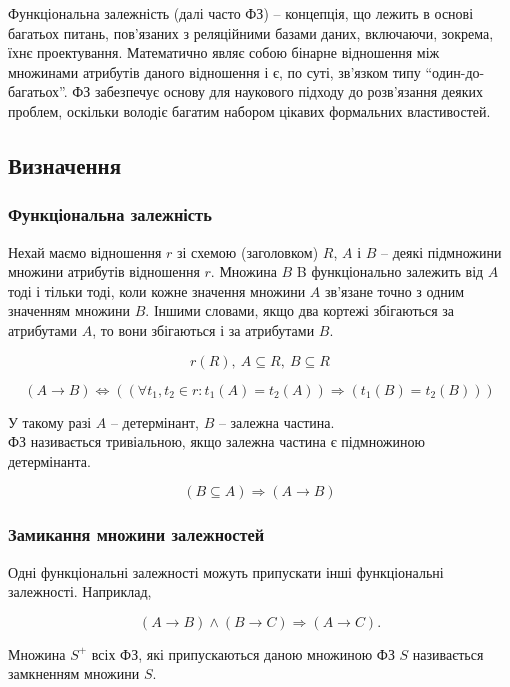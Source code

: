Функціональна залежність (далі часто ФЗ) -- концепція, що лежить в основі багатьох питань, пов'язаних з реляційними базами даних, включаючи, зокрема, їхнє проектування. Математично являє собою бінарне відношення між множинами атрибутів даного відношення і є, по суті, зв'язком типу ``один-до-багатьох''. ФЗ забезпечує основу для наукового підходу до розв'язання деяких проблем, оскільки володіє багатим набором цікавих формальних властивостей.

\subsection{Визначення}

\subsubsection{Функціональна залежність}

Нехай маємо відношення $r$ зі схемою (заголовком) $R$, $A$ і $B$ -- деякі підмножини множини атрибутів відношення $r$. Множина $B$ B функціонально залежить від $A$ тоді і тільки тоді, коли кожне значення множини $A$ зв'язане точно з одним значенням множини $B$. Іншими словами, якщо два кортежі збігаються за атрибутами $A$, то вони збігаються і за атрибутами $B$. 

\[ r\left(R\right),\ A\subseteq R,\ B\subseteq R \]

\[ \left(A\to B\right)\Leftrightarrow \left(\left(\forall {{t}_{1}},{{t}_{2}}\in r:{{t}_{1}}\left(A\right)={{t}_{2}}\left(A\right)\right)\Rightarrow \left({{t}_{1}}\left(B\right)={{t}_{2}}\left(B\right)\right)\right) \]

У такому разі $A$ -- детермінант, $B$ -- залежна частина. \\

ФЗ називається тривіальною, якщо залежна частина є підмножиною детермінанта.

\[ \left(B\subseteq A\right)\Rightarrow \left(A\to B\right) \]

\subsubsection{Замикання множини залежностей}

Одні функціональні залежності можуть припускати інші функціональні залежності. Наприклад,

\[ \left(A\to B\right)\wedge \left(B\to C\right)\Rightarrow \left(A\to C\right). \]

Множина ${{S}^{+}}$ всіх ФЗ, які припускаються даною множиною ФЗ $S$ називається замкненням множини $S$.

